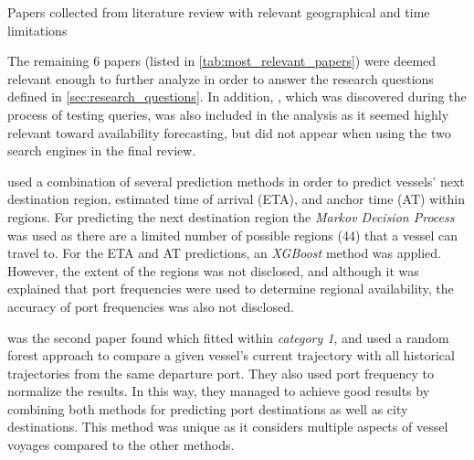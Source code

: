 \begin{table}[tbp]
    \centering
\caption{Papers collected from literature review with relevant geographical and time limitations}\label{tab:most_relevant_papers}
\end{table}

The remaining \textbf{}6 papers (listed in \cref{tab:most_relevant_papers}) were deemed relevant enough to further analyze in order to answer the research questions defined in \cref{sec:research_questions}. In addition, \cite{lechtenberg2019}, which was discovered during the process of testing queries, was also included in the analysis as it seemed highly relevant toward availability forecasting, but did not appear when using the two search engines in the final review.



\cite{lechtenberg2019} used a combination of several prediction methods in order to predict vessels’ next destination region, estimated time of arrival (ETA), and anchor time (AT) within regions. For predicting the next destination region the \textit{Markov Decision Process} was used as there are a limited number of possible regions (44) that a vessel can travel to. For the ETA and AT predictions, an \textit{XGBoost} method was applied. However, the extent of the regions was not disclosed, and although it was explained that port frequencies were used to determine regional availability, the accuracy of port frequencies was also not disclosed.


\cite{ZHANG2020102729} was the second paper found which fitted within \textit{category 1}, and used a random forest approach to compare a given vessel’s current trajectory with all historical trajectories from the same departure port. They also used port frequency to normalize the results. In this way, they managed to achieve good results by combining both methods for predicting port destinations as well as city destinations. This method was unique as it considers multiple aspects of vessel voyages compared to the other methods.\\

